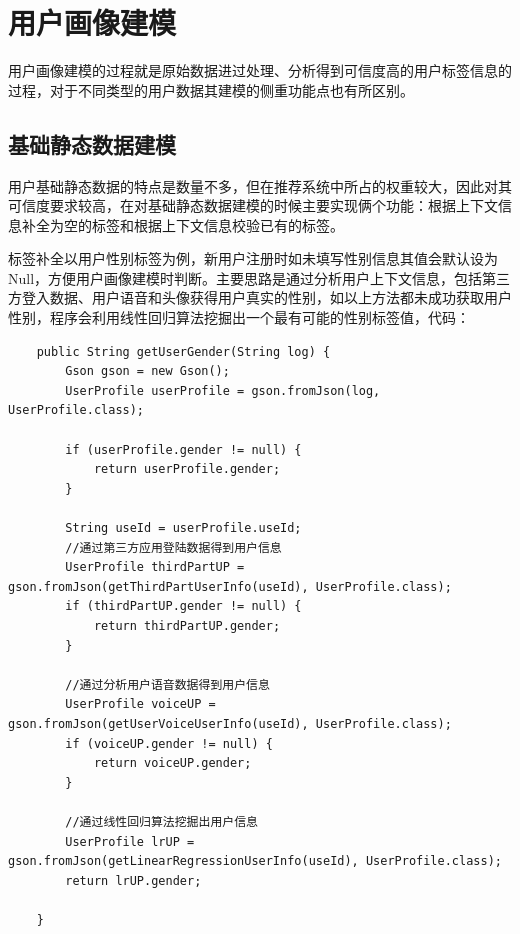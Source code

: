   \section{用户画像建模}
  用户画像建模的过程就是原始数据进过处理、分析得到可信度高的用户标签信息的过程，对于不同类型的用户数据其建模的侧重功能点也有所区别。
  \subsection{基础静态数据建模}
  用户基础静态数据的特点是数量不多，但在推荐系统中所占的权重较大，因此对其可信度要求较高，在对基础静态数据建模的时候主要实现俩个功能：根据上下文信息补全为空的标签和根据上下文信息校验已有的标签。

  标签补全以用户性别标签为例，新用户注册时如未填写性别信息其值会默认设为Null，方便用户画像建模时判断。主要思路是通过分析用户上下文信息，包括第三方登入数据、用户语音和头像获得用户真实的性别，如以上方法都未成功获取用户性别，程序会利用线性回归算法挖掘出一个最有可能的性别标签值，代码：
  \begin{lstlisting}
    public String getUserGender(String log) {
        Gson gson = new Gson();
        UserProfile userProfile = gson.fromJson(log, UserProfile.class);

        if (userProfile.gender != null) {
            return userProfile.gender;
        }

        String useId = userProfile.useId;
        //通过第三方应用登陆数据得到用户信息
        UserProfile thirdPartUP = gson.fromJson(getThirdPartUserInfo(useId), UserProfile.class);
        if (thirdPartUP.gender != null) {
            return thirdPartUP.gender;
        }

        //通过分析用户语音数据得到用户信息
        UserProfile voiceUP = gson.fromJson(getUserVoiceUserInfo(useId), UserProfile.class);
        if (voiceUP.gender != null) {
            return voiceUP.gender;
        }

        //通过线性回归算法挖掘出用户信息
        UserProfile lrUP = gson.fromJson(getLinearRegressionUserInfo(useId), UserProfile.class);
        return lrUP.gender;

    }
  \end{lstlisting}

